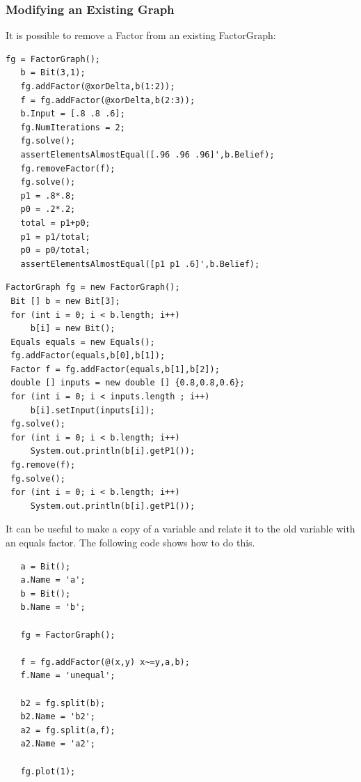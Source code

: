 \subsubsection{Modifying an Existing Graph}


It is possible to remove a Factor from an existing FactorGraph:

\ifmatlab

\begin{lstlisting}
fg = FactorGraph();
   b = Bit(3,1);
   fg.addFactor(@xorDelta,b(1:2));
   f = fg.addFactor(@xorDelta,b(2:3));
   b.Input = [.8 .8 .6];
   fg.NumIterations = 2;
   fg.solve();
   assertElementsAlmostEqual([.96 .96 .96]',b.Belief);
   fg.removeFactor(f);
   fg.solve();
   p1 = .8*.8;
   p0 = .2*.2;
   total = p1+p0;
   p1 = p1/total;
   p0 = p0/total;
   assertElementsAlmostEqual([p1 p1 .6]',b.Belief);
\end{lstlisting}

\fi

\ifjava

\begin{lstlisting}
FactorGraph fg = new FactorGraph();
 Bit [] b = new Bit[3];
 for (int i = 0; i < b.length; i++)
	 b[i] = new Bit();
 Equals equals = new Equals();
 fg.addFactor(equals,b[0],b[1]);
 Factor f = fg.addFactor(equals,b[1],b[2]);
 double [] inputs = new double [] {0.8,0.8,0.6};
 for (int i = 0; i < inputs.length ; i++)
	 b[i].setInput(inputs[i]);
 fg.solve();
 for (int i = 0; i < b.length; i++)
	 System.out.println(b[i].getP1());
 fg.remove(f);
 fg.solve();
 for (int i = 0; i < b.length; i++)
	 System.out.println(b[i].getP1());
\end{lstlisting}
\fi


It can be useful to make a copy of a variable and relate it to the old variable with an equals factor. The following code shows how to do this.

\ifmatlab

\begin{lstlisting}
   a = Bit();
   a.Name = 'a';
   b = Bit();
   b.Name = 'b';
  
   fg = FactorGraph();
  
   f = fg.addFactor(@(x,y) x~=y,a,b);
   f.Name = 'unequal';
   
   b2 = fg.split(b);
   b2.Name = 'b2';
   a2 = fg.split(a,f);
   a2.Name = 'a2';
   
   fg.plot(1);
\end{lstlisting}

